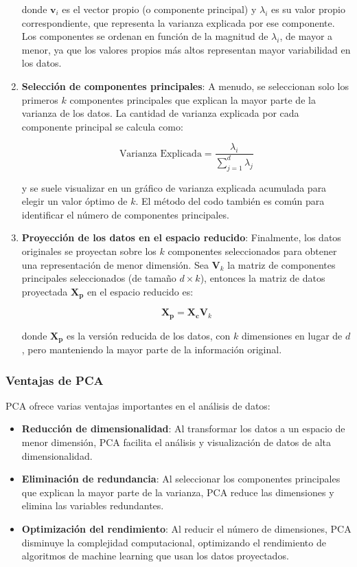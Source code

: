 \begin{enumerate}
    donde \(\mathbf{v}_i\) es el vector propio (o componente principal) y \(\lambda_i\) es su valor propio correspondiente, que representa la varianza explicada por ese componente. Los componentes se ordenan en función de la magnitud de \(\lambda_i\), de mayor a menor, ya que los valores propios más altos representan mayor variabilidad en los datos.

    \item \textbf{Selección de componentes principales}: 
    A menudo, se seleccionan solo los primeros \(k\) componentes principales que explican la mayor parte de la varianza de los datos. La cantidad de varianza explicada por cada componente principal se calcula como:

    \[
    \text{Varianza Explicada} = \frac{\lambda_i}{\sum_{j=1}^{d} \lambda_j}
    \]

    y se suele visualizar en un gráfico de varianza explicada acumulada para elegir un valor óptimo de \(k\). El método del codo también es común para identificar el número de componentes principales.

    \item \textbf{Proyección de los datos en el espacio reducido}: 
    Finalmente, los datos originales se proyectan sobre los \(k\) componentes seleccionados para obtener una representación de menor dimensión. Sea \(\mathbf{V}_k\) la matriz de componentes principales seleccionados (de tamaño \(d \times k\)), entonces la matriz de datos proyectada \(\mathbf{X_p}\) en el espacio reducido es:

    \[
    \mathbf{X_p} = \mathbf{X_c} \mathbf{V}_k
    \]

    donde \(\mathbf{X_p}\) es la versión reducida de los datos, con \(k\) dimensiones en lugar de \(d\), pero manteniendo la mayor parte de la información original.
\end{enumerate}

\subsubsection{Ventajas de PCA}

PCA ofrece varias ventajas importantes en el análisis de datos:

\begin{itemize}
    \item \textbf{Reducción de dimensionalidad}: Al transformar los datos a un espacio de menor dimensión, PCA facilita el análisis y visualización de datos de alta dimensionalidad.
    \item \textbf{Eliminación de redundancia}: Al seleccionar los componentes principales que explican la mayor parte de la varianza, PCA reduce las dimensiones y elimina las variables redundantes.
    \item \textbf{Optimización del rendimiento}: Al reducir el número de dimensiones, PCA disminuye la complejidad computacional, optimizando el rendimiento de algoritmos de machine learning que usan los datos proyectados.
\end{itemize}



